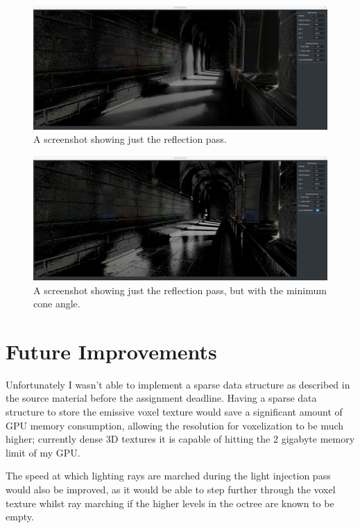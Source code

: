 \documentclass[]{acmsiggraph}
\begin{document}
\begin{figure}[htbp]\centering
 \includegraphics[width=1.0\linewidth]{images/reflection_only.png}
 \caption{\label{fig:reference}A screenshot showing just the reflection pass.}
\end{figure}

\begin{figure}[htbp]\centering
 \includegraphics[width=1.0\linewidth]{images/reflection_only_no_roughness.png}
 \caption{\label{fig:reference}A screenshot showing just the reflection pass, but with the minimum cone angle.}
\end{figure}

\section{Future Improvements}

Unfortunately I wasn't able to implement a sparse data structure as described in the source material\cite{crassin_neyret_sainz_green_eisemann_2011} before the assignment deadline. Having a sparse data structure to store the emissive voxel texture would save a significant amount of GPU memory consumption, allowing the resolution for voxelization to be much higher; currently dense 3D textures it is capable of hitting the 2 gigabyte memory limit of my GPU.

The speed at which lighting rays are marched during the light injection pass would also be improved, as it would be able to step further through the voxel texture whilst ray marching if the higher levels in the octree are known to be empty.
\end{document}

